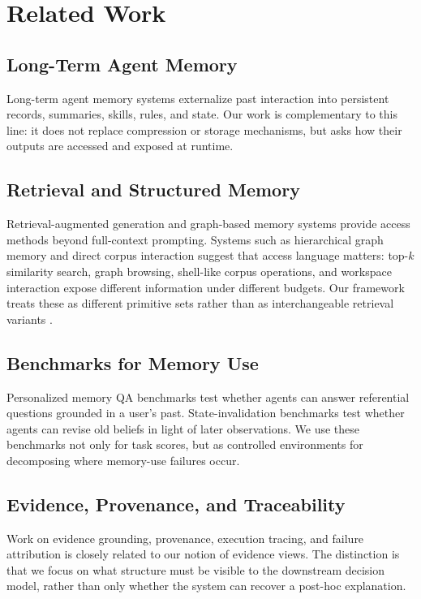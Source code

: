 \section{Related Work}
\label{sec:related_work}

\subsection{Long-Term Agent Memory}
\label{subsec:rw-agent-memory}

Long-term agent memory systems externalize past interaction into persistent records, summaries, skills, rules, and state.
Our work is complementary to this line: it does not replace compression or storage mechanisms, but asks how their outputs are accessed and exposed at runtime.

\subsection{Retrieval and Structured Memory}
\label{subsec:rw-retrieval}

Retrieval-augmented generation and graph-based memory systems provide access methods beyond full-context prompting.
Systems such as hierarchical graph memory and direct corpus interaction suggest that access language matters: top-$k$ similarity search, graph browsing, shell-like corpus operations, and workspace interaction expose different information under different budgets.
Our framework treats these as different primitive sets rather than as interchangeable retrieval variants \cite{tang2026mnemis}.

\subsection{Benchmarks for Memory Use}
\label{subsec:rw-benchmarks}

Personalized memory QA benchmarks test whether agents can answer referential questions grounded in a user's past.
State-invalidation benchmarks test whether agents can revise old beliefs in light of later observations.
We use these benchmarks not only for task scores, but as controlled environments for decomposing where memory-use failures occur.

\subsection{Evidence, Provenance, and Traceability}
\label{subsec:rw-evidence}

Work on evidence grounding, provenance, execution tracing, and failure attribution is closely related to our notion of evidence views.
The distinction is that we focus on what structure must be visible to the downstream decision model, rather than only whether the system can recover a post-hoc explanation.
